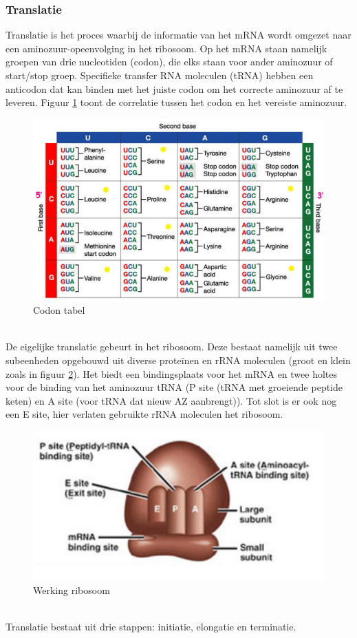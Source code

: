 \documentclass[a4paper,kul]{kulakarticle} %
\begin{document}
\subsubsection{Translatie}
Translatie is het proces waarbij de informatie van het mRNA wordt omgezet naar een aminozuur-opeenvolging in het ribosoom. Op het mRNA staan namelijk groepen van drie nucleotiden (codon), die elks staan voor ander aminozuur of start/stop groep. Specifieke transfer RNA moleculen (tRNA) hebben een anticodon dat kan binden met het juiste codon om het correcte aminozuur af te leveren. Figuur \ref{fig:codontable} toont de correlatie tussen het codon en het vereiste aminozuur.
\begin{figure}[h]
	\centering
	\includegraphics[width=0.7\linewidth]{CodonTable}
	\caption[Codon Tabel]{Codon tabel}
	\label{fig:codontable}
\end{figure}\\
De eigelijke translatie gebeurt in het ribosoom. Deze bestaat namelijk uit twee subeenheden opgebouwd uit diverse proteïnen en rRNA moleculen (groot en klein zoals in figuur \ref{fig:werkingribosoom}). Het biedt een bindingsplaats voor het mRNA en twee holtes voor de binding van het aminozuur tRNA (P site (tRNA met groeiende peptide keten) en A site (voor tRNA dat nieuw AZ aanbrengt)). Tot slot is er ook nog een E site, hier verlaten gebruikte rRNA moleculen het ribosoom. 
\begin{figure}[h]
	\centering
	\includegraphics[width=0.7\linewidth]{WerkingRibosoom}
	\caption[Werking ribosoom]{Werking ribosoom}
	\label{fig:werkingribosoom}
\end{figure}\\
\newpage
Translatie bestaat uit drie stappen: initiatie, elongatie en terminatie. 
\end{document}
